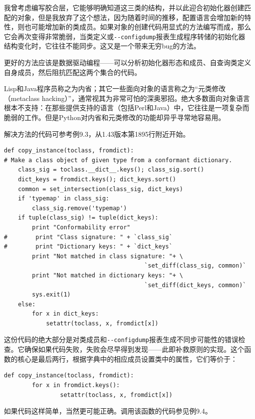 \documentclass[12pt,oneside]{book}
\begin{document}
我曾考虑编写胶合层，它能够明确知道这三类的结构，并以此迎合初始化器创建匹配的对象，但是我放弃了这个想法，因为随着时间的推移，配置语言会增加新的特性，则也可能增加新的类成员。如果对象的创建代码用显式的方法编写而成，那么它会再次变得非常脆弱，当类定义或\verb+--configdump+报表生成程序转储的初始化器结构变化时，它往往不能同步。这又是一个带来无穷bug的方法。

更好的方法应该是数据驱动编程——可以分析初始化器形态和成员、自查询类定义自身成员，然后阻抗匹配这两个集合的代码。

Lisp和Java程序员称之为内省；其它一些面向对象的语言称之为“元类修改（metaclass hacking）”，通常视其为非常可怕的深奥邪招。绝大多数面向对象语言根本不支持：在那些提供支持的语言（包括Perl和Java）中，它往往是一项复杂而脆弱的工作。但是Python对内省和元类修改的功能却异乎寻常地容易用。

解决方法的代码可参考例9.3，从1.43版本第1895行附近开始。

\begin{Verbatim}[label=例9.3 copy\_{}instance的元类代码]
def copy_instance(toclass, fromdict):
# Make a class object of given type from a conformant dictionary.
    class_sig = toclass.__dict__.keys(); class_sig.sort()
    dict_keys = fromdict.keys(); dict_keys.sort()
    common = set_intersection(class_sig, dict_keys)
    if 'typemap' in class_sig: 
        class_sig.remove('typemap')
    if tuple(class_sig) != tuple(dict_keys):
        print "Conformability error"
#        print "Class signature: " + `class_sig`
#        print "Dictionary keys: " + `dict_keys`
        print "Not matched in class signature: "+ \
                                        `set_diff(class_sig, common)`
        print "Not matched in dictionary keys: "+ \
                                        `set_diff(dict_keys, common)`
        sys.exit(1)
    else:
        for x in dict_keys:
            setattr(toclass, x, fromdict[x])
\end{Verbatim}

这份代码的绝大部分是对类成员和\verb+--configdump+报表生成不同步可能性的错误检查。它确保如果代码失败，失败会尽早得到发现——此即补救原则的实现。这个函数的核心是最后两行，根据字典中的相应成员设置类中的属性，它们等价于：
\begin{Verbatim}
def copy_instance(toclass, fromdict):
        for x in fromdict.keys():
                setattr(toclass, x, fromdict[x])
\end{Verbatim}


如果代码这样简单，当然更可能正确。调用该函数的代码参见例9.4。
\end{document}
